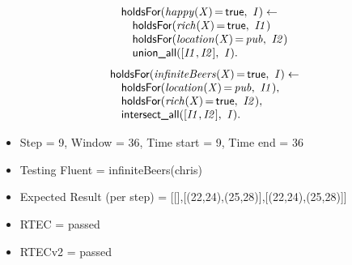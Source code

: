 \documentclass[8pt]{beamer}
\DeclareMathOperator{\val}{=}  %
\def \patsize {}
\def\holdsFor{\textsf{\patsize holdsFor}}
\def\unionall{\textsf{\patsize union\_all}}
\def\intersectall{\textsf{\patsize intersect\_all}}
\def\true{\textsf{\patsize true}}
\newenvironment{mysplit}%
  {\arraycolsep 0pt \begin{array}{l}}%
  {\end{array}}
\begin{document}
\begin{frame}
\begin{minipage}{0.48\linewidth}
        \begin{align*}
            \begin{mysplit}
                \holdsFor\mathit{(happy(X)\val\true,\ I) \leftarrow}\\
                \quad    \holdsFor\mathit{(rich(X)\val\true,\ I1)}\\
                \quad    \holdsFor\mathit{(location(X)\val pub,\ I2)}\\
                \quad    \unionall\mathit{([I1,I2],\ I)}.
            \end{mysplit}
        \end{align*}
        \begin{align*}
            \begin{mysplit}
                \holdsFor\mathit{(infiniteBeers(X)\val\true,\ I) \leftarrow}\\
                \quad    \holdsFor\mathit{(location(X)\val pub,\ I1),}\\
                \quad    \holdsFor\mathit{(rich(X)\val\true,\ I2),}\\
                \quad    \intersectall\mathit{([I1,I2],\ I).}\\
            \end{mysplit}
        \end{align*}
    \end{minipage}

    \begin{itemize}
        \item Step = 9, Window = 36, Time start = 9, Time end = 36
        \item Testing Fluent = infiniteBeers(chris) 
        \item Expected Result (per step) = [[],[(22,24),(25,28)],[(22,24),(25,28)]]
        \item RTEC = passed
        \item RTECv2 = passed
    \end{itemize}
\end{frame}
\end{document}
